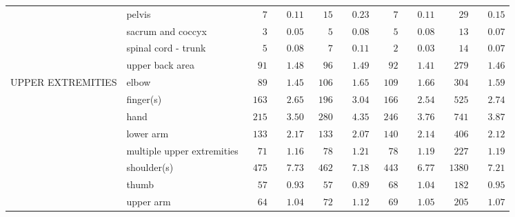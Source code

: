 \documentclass[9pt, oneside]{article}   	%
\begin{document}
\begin{longtable}{p{1.8in}p{2.2in}cccccccc}
 & pelvis  & $\phantom{000}7$ & $\phantom{00}0.11$ & $\phantom{00}15$ & $\phantom{00}0.23$ & $\phantom{000}7$ & $\phantom{00}0.11$ & $\phantom{000}29$ & $\phantom{00}0.15$ \\
 & sacrum and coccyx  & $\phantom{000}3$ & $\phantom{00}0.05$ & $\phantom{000}5$ & $\phantom{00}0.08$ & $\phantom{000}5$ & $\phantom{00}0.08$ & $\phantom{000}13$ & $\phantom{00}0.07$ \\
 & spinal cord - trunk  & $\phantom{000}5$ & $\phantom{00}0.08$ & $\phantom{000}7$ & $\phantom{00}0.11$ & $\phantom{000}2$ & $\phantom{00}0.03$ & $\phantom{000}14$ & $\phantom{00}0.07$ \\
 & upper back area  & $\phantom{00}91$ & $\phantom{00}1.48$ & $\phantom{00}96$ & $\phantom{00}1.49$ & $\phantom{00}92$ & $\phantom{00}1.41$ & $\phantom{00}279$ & $\phantom{00}1.46$ \\
UPPER EXTREMITIES & elbow  & $\phantom{00}89$ & $\phantom{00}1.45$ & $\phantom{0}106$ & $\phantom{00}1.65$ & $\phantom{0}109$ & $\phantom{00}1.66$ & $\phantom{00}304$ & $\phantom{00}1.59$ \\
 & finger(s)  & $\phantom{0}163$ & $\phantom{00}2.65$ & $\phantom{0}196$ & $\phantom{00}3.04$ & $\phantom{0}166$ & $\phantom{00}2.54$ & $\phantom{00}525$ & $\phantom{00}2.74$ \\
 & hand  & $\phantom{0}215$ & $\phantom{00}3.50$ & $\phantom{0}280$ & $\phantom{00}4.35$ & $\phantom{0}246$ & $\phantom{00}3.76$ & $\phantom{00}741$ & $\phantom{00}3.87$ \\
 & lower arm  & $\phantom{0}133$ & $\phantom{00}2.17$ & $\phantom{0}133$ & $\phantom{00}2.07$ & $\phantom{0}140$ & $\phantom{00}2.14$ & $\phantom{00}406$ & $\phantom{00}2.12$ \\
 & multiple upper extremities  & $\phantom{00}71$ & $\phantom{00}1.16$ & $\phantom{00}78$ & $\phantom{00}1.21$ & $\phantom{00}78$ & $\phantom{00}1.19$ & $\phantom{00}227$ & $\phantom{00}1.19$ \\
 & shoulder(s)  & $\phantom{0}475$ & $\phantom{00}7.73$ & $\phantom{0}462$ & $\phantom{00}7.18$ & $\phantom{0}443$ & $\phantom{00}6.77$ & $\phantom{0}1380$ & $\phantom{00}7.21$ \\
 & thumb  & $\phantom{00}57$ & $\phantom{00}0.93$ & $\phantom{00}57$ & $\phantom{00}0.89$ & $\phantom{00}68$ & $\phantom{00}1.04$ & $\phantom{00}182$ & $\phantom{00}0.95$ \\
 & upper arm  & $\phantom{00}64$ & $\phantom{00}1.04$ & $\phantom{00}72$ & $\phantom{00}1.12$ & $\phantom{00}69$ & $\phantom{00}1.05$ & $\phantom{00}205$ & $\phantom{00}1.07$ \\

\end{longtable}
\end{document}
